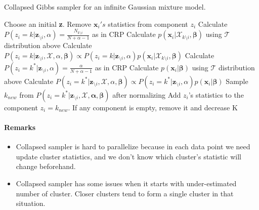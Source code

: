 \documentclass[a4paper]{article}
\begin{document}
\begin{algorithm}
  \caption{Collapsed Gibbs sampler for an infinite Gaussian mixture model.}\label{collapsedgibbs}
  \begin{algorithmic}[1]
    
  \State Choose an initial \textbf{z}.
   
        \State Remove $\mathbf{x}_i's$ statistics from component $z_i$ 
         
            \State Calculate $P(z_i = k | \mathbf{z}_{\setminus i},\alpha) = \frac{N_{k\setminus i}}{N+\alpha-1}$ as in CRP
            \State Calculate $p(\mathbf{x}_i|\mathcal{X}_{k\setminus i},\mathbf{\beta})$ using $\mathcal{T}$ distribution above
            \State Calculate $P(z_i = k | \mathbf{z}_{\setminus i},\mathcal{X},\alpha,\mathbf{\beta}) \propto P(z_i = k | \mathbf{z}_{\setminus i},\alpha) p(\mathbf{x}_i|\mathcal{X}_{k\setminus i}, \mathbf{\beta})$
        \EndFor
        \State Calculate $P(z_i = k^* | \mathbf{z}_{\setminus i},\alpha) = \frac{\alpha}{N+\alpha-1}$ as in CRP 
        \State Calculate $p(\mathbf{x}_i|\mathbf{\beta})$ using $\mathcal{T}$ distribution above
        \State Calculate $P(z_i = k^* | \mathbf{z}_{\setminus i},\mathcal{X},\alpha, \mathbf{\beta}) \propto P(z_i = k^* | \mathbf{z}_{\setminus i},\alpha)p(\mathbf{x}_i|\mathbf{\beta})$
        \State Sample $k_{new}$ from $P(z_i = k^* | \mathbf{z}_{\setminus i},\mathcal{X},\mathbf{\alpha},\mathbf{\beta})$ after normalizing
        \State Add $z_i$'s statistics to the component $z_i = k_{new}$.
        \State If any component is empty, remove it and decrease K
    \EndFor
  \EndFor
  \end{algorithmic}
\end{algorithm}


\paragraph{Remarks}

\begin{itemize}
\item
  Collapsed sampler is hard to parallelize because in each data point we
  need update cluster statistics, and we don't know which cluster's
  statistic will change beforehand.
\item
  Collapsed sampler has some issues when it starts with under-estimated
  number of cluster. Closer clusters tend to form a single cluster in
  that situation.
\end{itemize}
\end{document}
